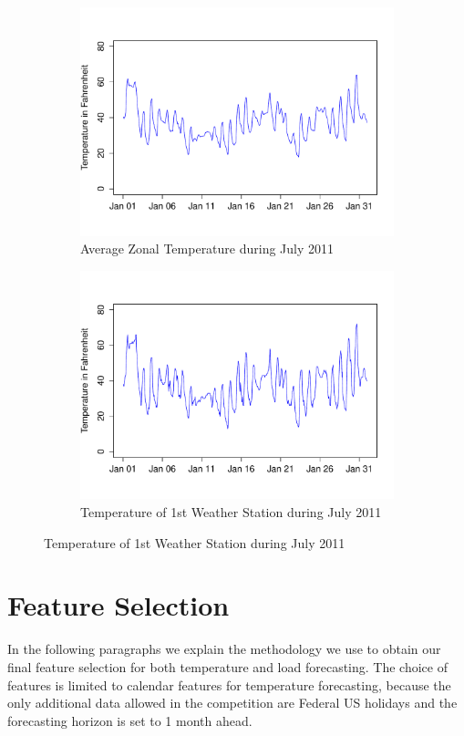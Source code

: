 \documentclass[conference]{IEEEtran}
\begin{document}
\begin{figure}[!ht]
\centering
\begin{subfigure}[b]{.6\linewidth}
\includegraphics[width=\linewidth]{gfx/avg-temp-2011.pdf}
\caption{Average Zonal Temperature during July 2011}
\label{subfig:avg-temp-2012}
\end{subfigure}
\quad
\begin{subfigure}[b]{.6\linewidth}
\includegraphics[width=\linewidth]{gfx/temp-station1-2011.pdf}
\caption{Temperature of 1st Weather Station during July 2011}
\label{subfig:temp-station1-2012}
\end{subfigure}
\end{figure}

\section{Feature Selection}
In the following paragraphs we explain the methodology we use to obtain our final feature selection for both temperature and load forecasting. The choice of features is limited to calendar features for temperature forecasting, because the only additional data allowed in the competition are Federal US holidays and the forecasting horizon is set to 1 month ahead.
\end{document}
